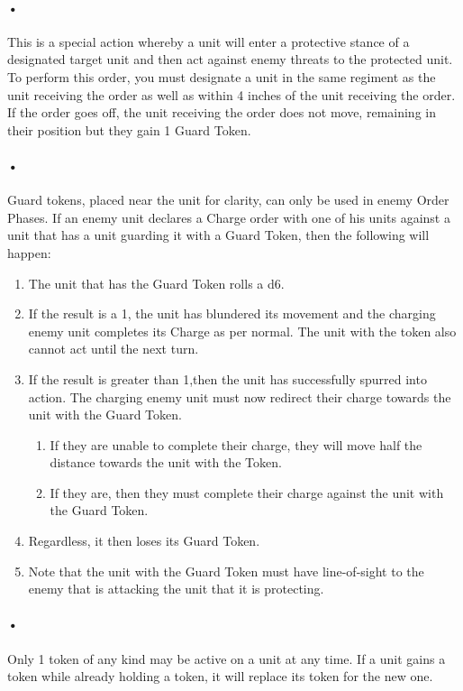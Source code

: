 \documentclass{article}
\begin{document}
\paragraph{•}
This is a special action whereby a unit will enter a protective stance of a designated target unit and then act against enemy threats to the protected unit. To perform this order, you must designate a unit in the same regiment as the unit receiving the order as well as within 4 inches of the unit receiving the order. If the order goes off, the unit receiving the order does not move, remaining in their position but they gain 1 Guard Token.

\paragraph{•}
Guard tokens, placed near the unit for clarity, can only be used in enemy Order Phases. If an enemy unit declares a Charge order with one of his units against a unit that has a unit guarding it with a Guard Token, then the following will happen:

\begin{enumerate}
\item The unit that has the Guard Token rolls a d6. 
\item If the result is a 1, the unit has blundered its movement and the charging enemy unit completes its Charge as per normal. The unit with the token also cannot act until the next turn. 
\item If the result is greater than 1,then the unit has successfully spurred into action. The charging enemy unit must now redirect their charge towards the unit with the Guard Token. 
\begin{enumerate}
\item If they are unable to complete their charge, they will move half the distance towards the unit with the Token. 
\item If they are, then they must complete their charge against the unit with the Guard Token. 

\end{enumerate}
\item Regardless, it then loses its Guard Token.
\item Note that the unit with the Guard Token must have line-of-sight to the enemy that is attacking the unit that it is protecting.
\end{enumerate}

\paragraph{•}
Only 1 token of any kind may be active on a unit at any time. If a unit gains a token while already holding a token, it will replace its token for the new one.
\end{document}
